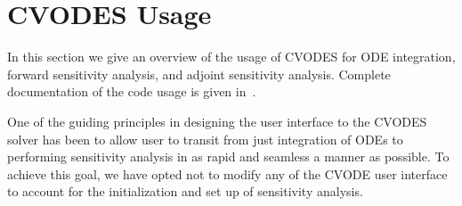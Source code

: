 \section{CVODES Usage}\label{s:usage}

In this section we give an overview of the usage of CVODES for ODE integration, 
forward sensitivity analysis, and adjoint sensitivity analysis. 
Complete documentation of the code usage is given in~\cite{HiSe:02}.

%
One of the guiding principles in designing the user interface to the 
CVODES solver has been to allow user to transit from just integration 
of ODEs to performing sensitivity analysis in as rapid and seamless a 
manner as possible. To achieve this goal, we have opted not to 
modify any of the CVODE user interface to account for the initialization
and set up of sensitivity analysis.

